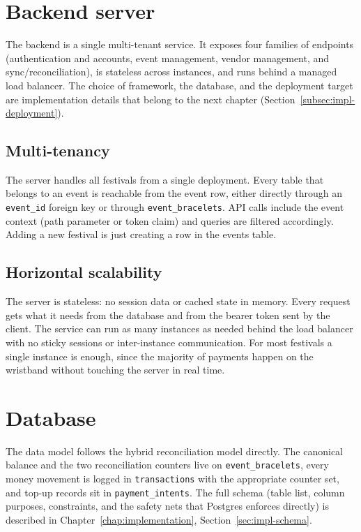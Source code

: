 \section{Backend server}
\label{sec:backend-server}

The backend is a single multi-tenant service. It exposes four families of endpoints (authentication and accounts, event management, vendor management, and sync/reconciliation), is stateless across instances, and runs behind a managed load balancer. The choice of framework, the database, and the deployment target are implementation details that belong to the next chapter (Section~\ref{subsec:impl-deployment}).

\subsection{Multi-tenancy}
\label{subsec:multi-tenancy}

The server handles all festivals from a single deployment. Every table that belongs to an event is reachable from the event row, either directly through an \texttt{event\_id} foreign key or through \texttt{event\_bracelets}. API calls include the event context (path parameter or token claim) and queries are filtered accordingly. Adding a new festival is just creating a row in the events table.

\subsection{Horizontal scalability}
\label{subsec:horizontal-scalability}

The server is stateless: no session data or cached state in memory. Every request gets what it needs from the database and from the bearer token sent by the client. The service can run as many instances as needed behind the load balancer with no sticky sessions or inter-instance communication. For most festivals a single instance is enough, since the majority of payments happen on the wristband without touching the server in real time.

\section{Database}
\label{sec:database}

The data model follows the hybrid reconciliation model directly. The canonical balance and the two reconciliation counters live on \texttt{event\_bracelets}, every money movement is logged in \texttt{transactions} with the appropriate counter set, and top-up records sit in \texttt{payment\_intents}. The full schema (table list, column purposes, constraints, and the safety nets that Postgres enforces directly) is described in Chapter~\ref{chap:implementation}, Section~\ref{sec:impl-schema}.

